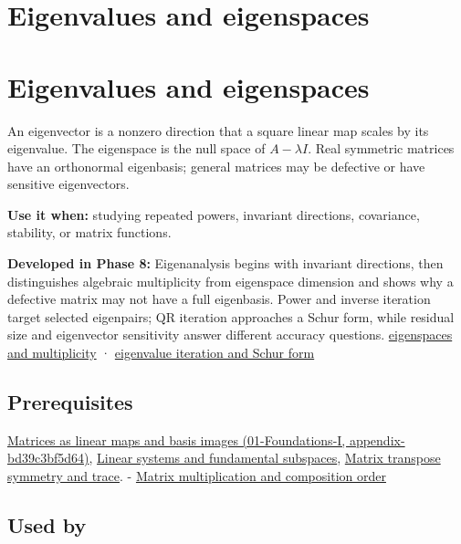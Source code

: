 \hypertarget{appendix-0b3be18411f9}{}
\section*{Eigenvalues and eigenspaces}
\section{Eigenvalues and eigenspaces}\label{eigenvalues-and-eigenspaces}

An eigenvector is a nonzero direction that a square linear map scales by its eigenvalue. The eigenspace is the null space of \(A-\lambda I\). Real symmetric matrices have an orthonormal eigenbasis; general matrices may be defective or have sensitive eigenvectors.

\textbf{Use it when:} studying repeated powers, invariant directions, covariance, stability, or matrix functions.

\textbf{Developed in Phase 8:} Eigenanalysis begins with invariant directions, then distinguishes algebraic multiplicity from eigenspace dimension and shows why a defective matrix may not have a full eigenbasis. Power and inverse iteration target selected eigenpairs; QR iteration approaches a Schur form, while residual size and eigenvector sensitivity answer different accuracy questions. \href{Continuous\%20Notes/Computing\%20Foundations\%20-\%20From\%20Bits\%20to\%20C++\%20and\%20Systems\%20APIs\#Eigenvalues,\%20eigenspaces,\%20and\%20the\%20two\%20kinds\%20of\%20multiplicity}{eigenspaces and multiplicity} · \href{Continuous\%20Notes/Computing\%20Foundations\%20-\%20From\%20Bits\%20to\%20C++\%20and\%20Systems\%20APIs\#QR\%20iteration\%20and\%20Jacobi\%20rotations\%20preserve\%20the\%20spectrum\%20while\%20simplifying\%20shape}{eigenvalue iteration and Schur form}

\subsection{Prerequisites}\label{prerequisites}

\href{}{Matrices as linear maps and basis images (01-Foundations-I, appendix-bd39c3bf5d64)}, \hyperref[appendix-8572a4a060c1]{Linear systems and fundamental subspaces}, \hyperref[appendix-175ca5ff874d]{Matrix transpose symmetry and trace}. - \hyperref[appendix-ab31ef447dbf]{Matrix multiplication and composition order}

\subsection{Used by}\label{used-by}

